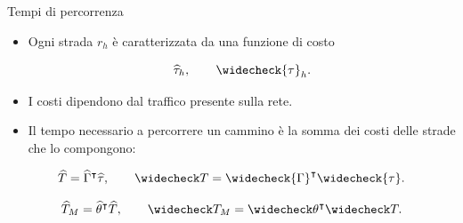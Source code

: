 \begin{frame}{Tempi di percorrenza}

\begin{itemize}
    \item Ogni strada $r_h$ è caratterizzata da una funzione di costo

    \[
    \widehat{\tau}_h,
    \qquad
    \widecheck{\tau}_h.
    \]

    \item I costi dipendono dal traffico presente sulla rete.

    \item Il tempo necessario a percorrere un cammino è la somma
    dei costi delle strade che lo compongono:
\end{itemize}

\[
\widehat T
=
\widehat{\Gamma}^{\intercal}
\widehat{\tau},
\qquad
\widecheck T
=
\widecheck{\Gamma}^{\intercal}
\widecheck{\tau}.
\]

\vspace{0.3cm}

\[
\widehat T_M
=
\widehat\theta^{\intercal}\widehat T,
\qquad
\widecheck T_M
=
\widecheck\theta^{\intercal}\widecheck T.
\]

\end{frame}